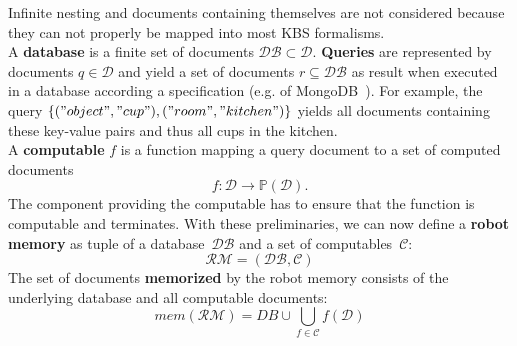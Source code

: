  Infinite nesting and
documents containing themselves are not considered because they can
not properly be mapped into most KBS formalisms.
\\
A \textbf{database} is a finite set of documents $\mathcal{DB} \subset \mathcal{D}$.
\textbf{Queries} are represented by documents $q\in\mathcal{D}$ and yield a set
of documents $r\subseteq\mathcal{DB}$ as result when executed in a database according a
specification (e.g. of MongoDB~\cite{mongodb}). For example, the query
$\{("object","cup"),("room","kitchen")\}$ yields all documents containing these
key-value pairs and thus all cups in the kitchen.
\\
A \textbf{computable} $f$ is a function mapping a query document to a
set of computed documents
$$f: \mathcal{D} \rightarrow \mathbb{P}(\mathcal{D})\text{.}$$
The component providing the computable has to ensure that the function is computable and terminates.
%
With these preliminaries, we can now define a \textbf{robot memory} as tuple
of a database~$\mathcal{DB}$ and a set of computables~$\mathcal{C}$:
$$\mathcal{RM}=(\mathcal{DB},\mathcal{C})$$
%
The set of documents \textbf{memorized} by the robot memory consists
of the underlying database and all computable documents:
$$mem(\mathcal{RM})=DB \cup \bigcup_{f\in\mathcal{C}}f(\mathcal{D})$$

